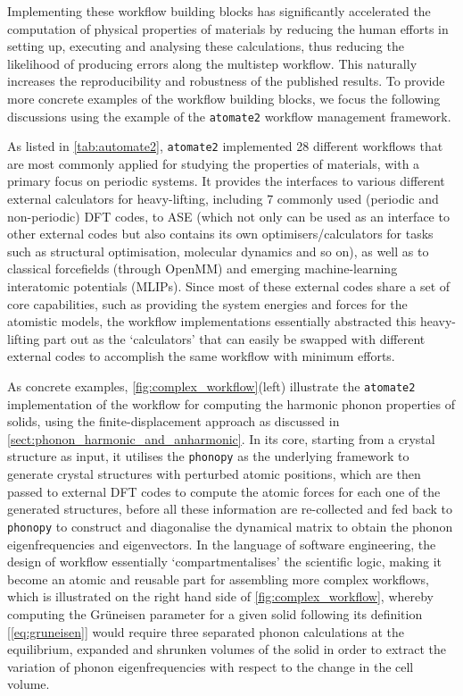Implementing these workflow building blocks has significantly accelerated the computation of physical properties of materials by reducing the human efforts in setting up, executing and analysing these calculations, thus reducing the likelihood of producing errors along the multistep workflow. This naturally increases the reproducibility and robustness of the published results. To provide more concrete examples of the workflow building blocks, we focus the following discussions using the example of the  \texttt{atomate2} workflow management framework.\cite{ganose2025atomate2} 

As listed in \cref{tab:automate2}, \texttt{atomate2} implemented 28 different workflows that are most commonly applied for studying the properties of materials, with a primary focus on periodic systems. It provides the interfaces to various different external calculators for heavy-lifting, including 7 commonly used (periodic and non-periodic) DFT codes, to ASE (which not only can be used as an interface to other external codes but also contains its own optimisers/calculators for tasks such as structural optimisation, molecular dynamics and so on), as well as to classical forcefields (through OpenMM\cite{eastman2023openmm}) and emerging machine-learning interatomic potentials (MLIPs). Since most of these external codes share a set of core capabilities, such as providing the system energies and forces for the atomistic models, the workflow implementations essentially abstracted this heavy-lifting part out as the `calculators' that can easily be swapped with different external codes to accomplish the same workflow with minimum efforts.  

As concrete examples, \cref{fig:complex_workflow}(left) illustrate the \texttt{atomate2} implementation of the workflow for computing the harmonic phonon properties of solids, using the finite-displacement approach as discussed in \cref{sect:phonon_harmonic_and_anharmonic}. In its core, starting from a crystal structure as input, it utilises the \texttt{phonopy}\cite{phonopy} as the underlying framework to generate crystal structures with perturbed atomic positions, which are then passed to external DFT codes to compute the atomic forces for each one of the generated structures, before all these information are re-collected and fed back to  \texttt{phonopy} to construct and diagonalise the dynamical matrix to obtain the phonon eigenfrequencies and eigenvectors. In the language of software engineering, the design of workflow essentially `compartmentalises' the scientific logic, making it become an atomic and reusable part for assembling more complex workflows, which is illustrated on the right hand side of \cref{fig:complex_workflow}, whereby computing the Gr\"{u}neisen parameter for a given solid following its definition [\cref{eq:gruneisen}] would require three separated phonon calculations at the equilibrium, expanded and shrunken volumes of the solid in order to extract the variation of phonon eigenfrequencies with respect to the change in the cell volume.

